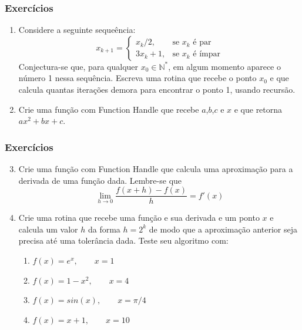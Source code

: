 \documentclass{beamer}
\begin{document}
\begin{frame}
\frametitle{Exerc\'icios}

\begin{enumerate}
\item Considere a seguinte seque\^encia:
$$x_{k+1} = \left\{
\begin{array}{ll}
x_k/2, & \mbox{se } x_k \mbox{ \'e par} \\
3x_k + 1, & \mbox{se } x_k \mbox{ \'e \'impar}
\end{array}
\right.$$
Conjectura-se que, para qualquer $x_0 \in \mathbb{N}^{*}$, em algum momento aparece o n\'umero 1 nessa sequ\^encia. Escreva uma rotina que recebe o ponto $x_0$ e que calcula quantas itera\c{c}\~oes demora para encontrar o ponto 1, usando recurs\~ao.
\item Crie uma fun\c{c}\~ao com Function Handle que recebe $a$,$b$,$c$ e $x$ e que retorna $ax^2+bx+c$.
\end{enumerate}

\end{frame}

\begin{frame}
\frametitle{Exerc\'icios}
\begin{enumerate}
\setcounter{enumi}{2}
\item Crie uma fun\c{c}\~ao com Function Handle que calcula uma aproxima\c{c}\~ao para a derivada de uma fun\c{c}\~ao dada. Lembre-se que
$$\lim_{h\rightarrow0}\frac{f(x+h)-f(x)}{h}=f'(x)$$
\item Crie uma rotina que recebe uma fun\c{c}\~ao e sua derivada e um ponto $x$ e calcula um valor $h$ da forma $h = 2^k$ de modo que a aproxima\c{c}\~ao anterior seja precisa at\'e uma toler\^ancia dada. Teste seu algoritmo com:
\begin{enumerate}
\item $f(x) = e^x, \qquad x = 1$
\item $f(x) = 1 - x^2, \qquad x = 4$
\item $f(x) = sin(x), \qquad x = \pi/4$
\item $f(x) = x + 1, \qquad x = 10$
\end{enumerate}
\end{enumerate}
\end{frame}
\end{document}

